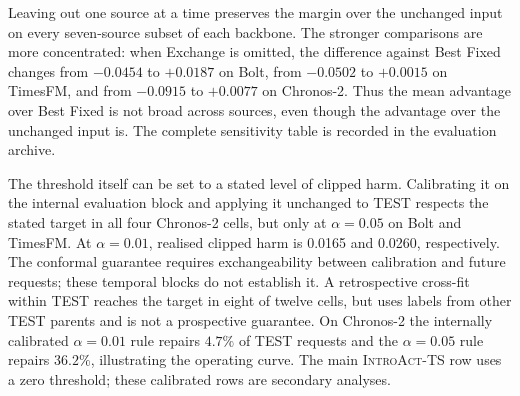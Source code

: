\documentclass{article}
\newcommand{\introact}{\textsc{IntroAct-TS}}
\begin{document}
Leaving out one source at a time preserves the margin over the unchanged input on every
seven-source subset of each backbone. The stronger comparisons are more concentrated: when
Exchange is omitted, the difference against Best Fixed changes from $-0.0454$ to $+0.0187$
on Bolt, from $-0.0502$ to $+0.0015$ on TimesFM, and from $-0.0915$ to $+0.0077$ on
Chronos-2. Thus the mean advantage over Best Fixed is not broad across sources, even though
the advantage over the unchanged input is. The complete sensitivity table is recorded
in the evaluation archive.



The threshold itself can be set to a stated level of clipped harm. Calibrating it on the
internal evaluation block and applying it unchanged to TEST respects the stated target in
all four Chronos-2 cells, but only at $\alpha=0.05$ on Bolt and TimesFM. At $\alpha=0.01$,
realised clipped harm is 0.0165 and 0.0260, respectively. The conformal guarantee requires
exchangeability between calibration and future requests; these temporal blocks do not
establish it. A retrospective cross-fit within TEST reaches the target in eight of twelve
cells, but uses labels from other TEST parents and is not a prospective guarantee. On
Chronos-2 the internally calibrated $\alpha=0.01$ rule repairs $4.7\%$ of TEST requests and
the $\alpha=0.05$ rule repairs $36.2\%$, illustrating the operating curve. The main
\introact{} row uses a zero threshold; these calibrated rows are secondary analyses.

\begin{table}[t]
  \caption{Retrospective TEST cross-fit of the execution threshold: each half of the parents
  supplies completed-request labels to calibrate the other half. These rows are not an
  independent prospective test. Target is clipped harmful loss, realised is the empirical
  clipped value, and repair rate is the executed share.}
  \label{tab:conformal}
  \centering
  \small
  \setlength{\tabcolsep}{5pt}
\end{table}
\end{document}
